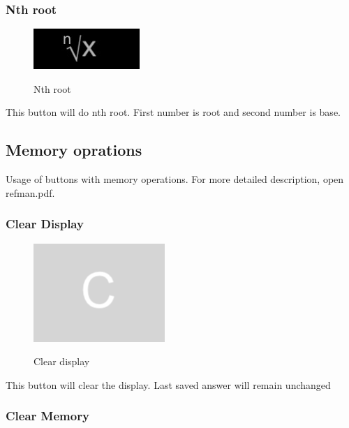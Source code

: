 \documentclass[11pt, a4paper]{article}
\begin{document}
    \subsubsection{Nth root}
    \label{subsubsec:nthroot}
        \begin{figure}[hbt!]
            \caption{Nth root}
            \includegraphics[scale = 0.2]{n-th_root}
            \centering
            \label{fig:root}
        \end{figure}
        
        This button will do nth root. First number is root and second number is base.
    \newpage
    
    \subsection{Memory oprations}
    Usage of buttons with memory operations.
    For more detailed description, open refman.pdf.
    \label{subsec:memoryoperations}

    \subsubsection{Clear Display }

    \label{subsubsec:cleardisplay}

    \begin{figure}[hbt!]
        \caption{Clear display}
        \includegraphics[scale = 0.2]{clear_display}
        \centering
        \label{fig:ac}
    \end{figure}
    This button will clear the display. Last saved answer will remain unchanged

    \subsubsection{Clear Memory}
    \label{subsubsec:clearmemory}
\end{document}
